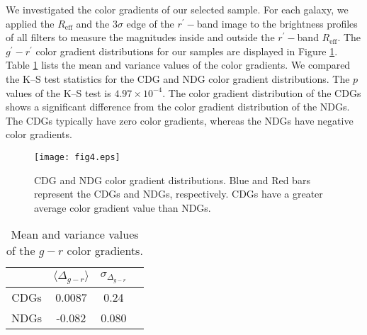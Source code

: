 \documentclass[fleqn,usenatbib]{mnras}
\begin{document}
We investigated the color gradients of our selected sample.
For each galaxy, we applied the $R_\mathrm{eff}$ and the $3\sigma$ edge of the $r^{\prime}-$band image to the brightness profiles of all filters to measure the magnitudes inside and outside the $r^{\prime}-$band $R_\mathrm{eff}$.
The $g^{\prime}-r^{\prime}$ color gradient distributions for our samples are displayed in Figure \ref{fig4}.
Table \ref{tab:table3} lists the mean and variance values of the color gradients.
We compared the K--S test statistics for the CDG and NDG color gradient distributions.
The $p$ values of the K--S test is $4.97 \times 10^{-4}$.
The color gradient distribution of the CDGs shows a significant difference from the color gradient distribution of the NDGs.
The CDGs typically have zero color gradients, whereas the NDGs have negative color gradients.

\begin{figure}
        \texttt{[image: fig4.eps]}
    \caption{CDG and NDG color gradient distributions.
    Blue and Red bars represent the CDGs and NDGs, respectively.
    CDGs have a greater average color gradient value than NDGs.}
    \label{fig4}
\end{figure}

\begin{table}
        \centering
        \caption{Mean and variance values of the $g-r$ color gradients.}
        \label{tab:table3}
        \begin{tabular}{cccc} 
                \hline
                & $\langle \Delta_{g-r} \rangle$ & $\sigma_{\Delta_{g-r}}$ \\
                \hline
                CDGs & 0.0087 & 0.24 \\
                NDGs & -0.082 & 0.080 \\
                \hline
        \end{tabular}
\end{table}
\end{document}
